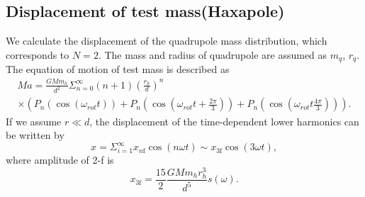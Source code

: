 \documentclass[12pt]{iopart}
\begin{document}
\subsection{Displacement of test mass(Haxapole)} \label{Quad}
We calculate the displacement of the quadrupole mass distribution, which corresponds to $N=2$.
The mass and radius of quadrupole are assumed as $m_q$, $r_q$. 
The equation of motion of test mass is described as
\begin{eqnarray}
Ma = \frac{GMm_h}{d^2}\Sigma^{\infty}_{n=0}(n+1) \left( \frac{r_h}{d} \right)^n \\
\times \left( P_n\left(\cos{\left(\omega_{rot} t \right)}\right) + P_n\left(\cos{\left(\omega_{rot} t+\frac{2\pi}{3} \right)} \right) + P_n\left(\cos{\left(\omega_{rot} t \frac{4\pi}{3} \right) }\right) \right).
\end{eqnarray} 
If we assume $r \ll d$, the displacement of the time-dependent lower harmonics can be written by 
\begin{equation}
x=\Sigma_{i=1}^{\infty}x_{n\mathrm{f}}\cos(n\omega t)\sim  x_{3\mathrm{f}}\cos(3\omega t),
\end{equation}
where amplitude of 2-f is
\begin{equation}
 x_{3\mathrm{f}}=\frac{15}{2}\frac{GMm_{h}r_{h}^3}{d^5}s(\omega). \label{3f}
\end{equation}
\end{document}
